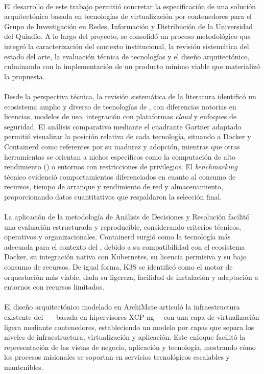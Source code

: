 \label{cap:conclusiones}
\mbox{}\\
\noindent
El desarrollo de este trabajo permitió concretar la especificación de una solución arquitectónica basada en tecnologías de virtualización por contenedores para el Grupo de Investigación en Redes, Información y Distribución de la Universidad del Quindío. A lo largo del proyecto, se consolidó un proceso metodológico que integró la caracterización del contexto institucional, la revisión sistemática del estado del arte, la evaluación técnica de tecnologías y el diseño arquitectónico, culminando con la implementación de un producto mínimo viable que materializó la propuesta.\\ \\
\noindent
Desde la perspectiva técnica, la revisión sistemática de la literatura identificó un ecosistema amplio y diverso de tecnologías de \VBC, con diferencias notorias en licencias, modelos de uso, integración con plataformas \textit{cloud} y enfoques de seguridad. El análisis comparativo mediante el cuadrante Gartner adaptado permitió visualizar la posición relativa de cada tecnología, situando a Docker y Containerd como referentes por su madurez y adopción, mientras que otras herramientas se orientan a nichos específicos como la computación de alto rendimiento (\HPC) o entornos con restricciones de privilegios. El \textit{benchmarking} técnico evidenció comportamientos diferenciados en cuanto al consumo de recursos, tiempo de arranque y rendimiento de red y almacenamiento, proporcionando datos cuantitativos que respaldaron la selección final.\\ \\
\noindent
La aplicación de la metodología de Análisis de Decisiones y Resolución facilitó una evaluación estructurada y reproducible, considerando criterios técnicos, operativos y organizacionales. Containerd surgió como la tecnología más adecuada para el contexto del \GRID, debido a su compatibilidad con el ecosistema Docker, su integración nativa con Kubernetes, su licencia permisiva y su bajo consumo de recursos. De igual forma, K3S se identificó como el motor de orquestación más viable, dada su ligereza, facilidad de instalación y adaptación a entornos con recursos limitados.\\ \\
\noindent
El diseño arquitectónico modelado en ArchiMate articuló la infraestructura existente del \GRID\ —basada en hipervisores XCP-ng— con una capa de virtualización ligera mediante contenedores, estableciendo un modelo por capas que separa los niveles de infraestructura, virtualización y aplicación. Este enfoque facilitó la representación de las vistas de negocio, aplicación y tecnología, mostrando cómo los procesos misionales se soportan en servicios tecnológicos escalables y mantenibles.\\ \\
